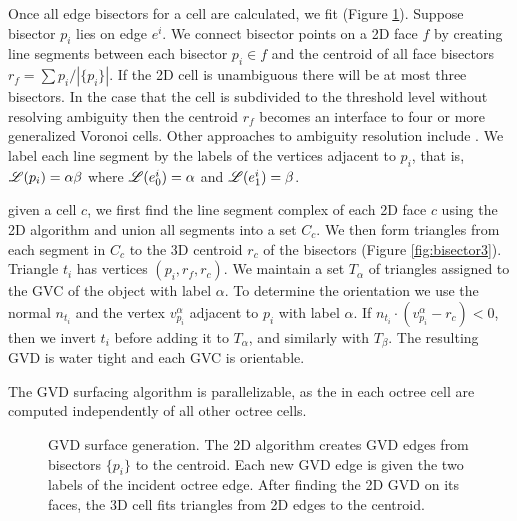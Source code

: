 \documentclass{egpubl}
\begin{document}
Once all edge bisectors for a cell are calculated, we fit  (Figure \ref{fig:bisector}). Suppose bisector $p_i$ lies on edge $e^i$. We connect bisector points on a 2D face $f$ by creating line segments between each bisector $p_i \in f$ and the centroid of all face bisectors $r_f = \sum p_i / |\{p_i\}|$.  If the 2D cell is unambiguous there will be at most three bisectors.  In the case that the cell is subdivided to the threshold level without resolving ambiguity then the centroid $r_f$ becomes an interface to four or more generalized Voronoi cells. Other approaches to ambiguity resolution include \cite{natarajan1994generating,nielson1991asymptotic,sohn2007topology}.   We label each line segment by the labels of the vertices adjacent to $p_i$, that is,  $\mathscr{L}(p_i) = \alpha\beta$ where $\mathscr{L}(e^i_0) = \alpha$ and $\mathscr{L}(e^i_1) = \beta$. 

 given a cell $c$, we first find the line segment complex of each 2D face $c$ using the 2D algorithm and union all segments into a set $C_c$.  We then form triangles from each segment in $C_c$
to the 3D centroid $r_c$ of the bisectors (Figure \ref{fig:bisector3}).  Triangle $t_i$ has vertices $(p_i, r_f, r_c)$. We maintain a set $T_{\alpha}$ of triangles assigned to the GVC of the object with label $\alpha$.
To determine the orientation we use the normal $n_{t_i}$ and the vertex $v_{p_i}^{\alpha}$ adjacent to $p_i$ with label $\alpha$. If $n_{t_i} \cdot (v_{p_i}^{\alpha}-r_c) < 0$, then we invert $t_i$ before adding it to $T_{\alpha}$, and similarly with $T_{\beta}$. The resulting GVD is water tight and each GVC is orientable.

The GVD surfacing algorithm is parallelizable, as the  in each octree cell are computed independently of all other octree cells.

\begin{figure}
  \centering
  \caption{GVD surface generation.
    \protect{} The 2D algorithm creates GVD edges from bisectors $\{p_i\}$ to the centroid.  Each new GVD edge is given the two labels of the incident octree edge.
    \protect{} After finding the 2D GVD on its faces, the 3D cell fits triangles from 2D edges to the centroid.  %
  }
  \label{fig:bisector}
\end{figure}
\end{document}
